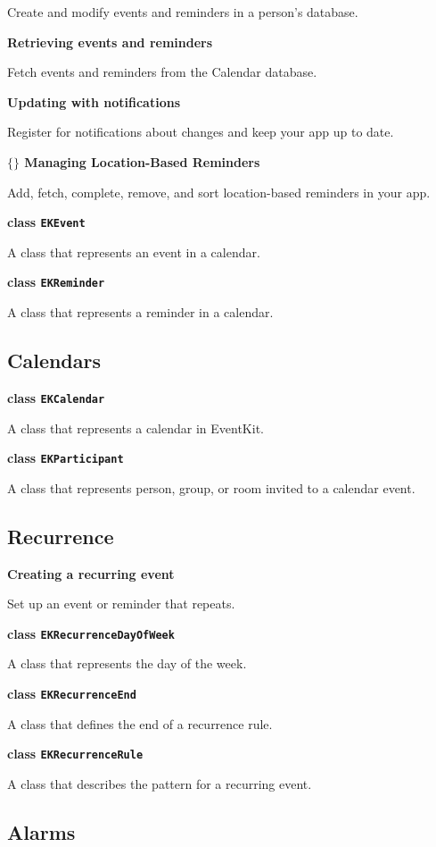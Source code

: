 \documentclass{article}
\begin{document}
Create and modify events and reminders in a person's database.

\textbf{Retrieving events and reminders}

Fetch events and reminders from the Calendar database.

\textbf{Updating with notifications}

Register for notifications about changes and keep your app up to date.

\textbf{$\lbrace\rbrace$ Managing Location-Based Reminders}

Add, fetch, complete, remove, and sort location-based reminders in your app.

\textbf{class \texttt{EKEvent}}

A class that represents an event in a calendar.

\textbf{class \texttt{EKReminder}}

A class that represents a reminder in a calendar.

\subsection*{Calendars}

\textbf{class \texttt{EKCalendar}}

A class that represents a calendar in EventKit.

\textbf{class \texttt{EKParticipant}}

A class that represents person, group, or room invited to a calendar event.

\subsection*{Recurrence}

\textbf{Creating a recurring event}

Set up an event or reminder that repeats.

\textbf{class \texttt{EKRecurrenceDayOfWeek}}

A class that represents the day of the week.

\textbf{class \texttt{EKRecurrenceEnd}}

A class that defines the end of a recurrence rule.

\textbf{class \texttt{EKRecurrenceRule}}

A class that describes the pattern for a recurring event.

\subsection*{Alarms}
\end{document}
